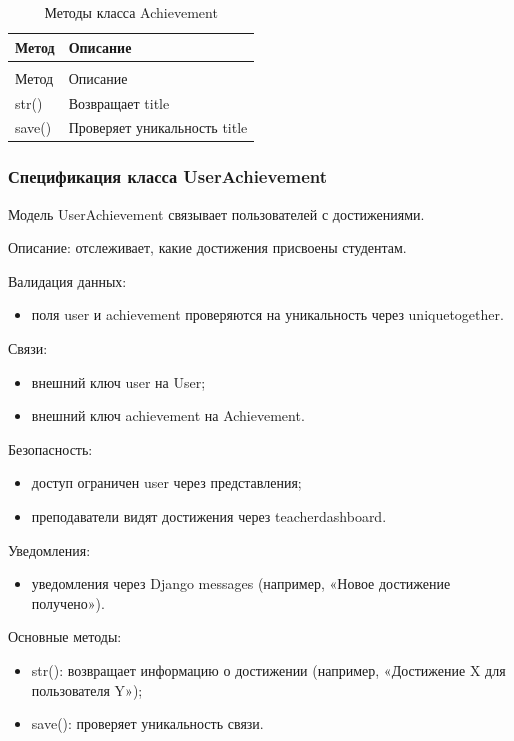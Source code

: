 \begin{xltabular}{\textwidth}{|l|X|}
	\caption{Методы класса Achievement\label{tab:achievement_methods}}\\
	\hline
	Метод & Описание \\ \hline
	\endfirsthead
	\\
	\hline
	Метод & Описание \\ \hline
	\endhead
	str() & Возвращает title \\ \hline
	save() & Проверяет уникальность title \\ \hline
\end{xltabular}

\subsubsection{Спецификация класса UserAchievement}

Модель UserAchievement связывает пользователей с достижениями.


Описание: отслеживает, какие достижения присвоены студентам.

Валидация данных:
	\begin{itemize}
		\item поля user и achievement проверяются на уникальность через uniquetogether.
	\end{itemize}
	
Связи:
	\begin{itemize}
		\item внешний ключ user на User;
		\item внешний ключ achievement на Achievement.
	\end{itemize}
	
Безопасность:
	\begin{itemize}
		\item доступ ограничен user через представления;
		\item преподаватели видят достижения через teacherdashboard.
	\end{itemize}
	
Уведомления:
	\begin{itemize}
		\item уведомления через Django messages (например, «Новое достижение получено»).
	\end{itemize}
	
Основные методы:
	\begin{itemize}
		\item str(): возвращает информацию о достижении (например, «Достижение X для пользователя Y»);
		\item save(): проверяет уникальность связи.
	\end{itemize}
	

